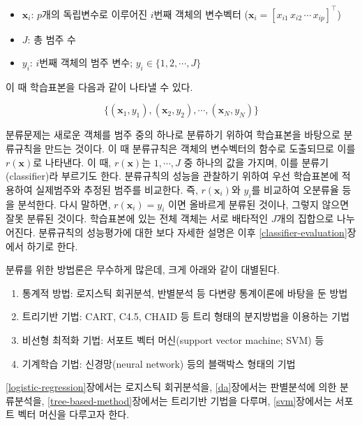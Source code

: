 \documentclass[]{book}
\providecommand{\tightlist}{%
  \setlength{\itemsep}{0pt}\setlength{\parskip}{0pt}}
\begin{document}
\begin{itemize}
\tightlist
\item
  \(\mathbf{x}_i\): \(p\)개의 독립변수로 이루어진 \(i\)번째 객체의 변수벡터 (\(\mathbf{x}_i = [x_{i1} \, x_{i2} \, \cdots \, x_{ip}]^\top\))
\item
  \(J\): 총 범주 수
\item
  \(y_i\): \(i\)번째 객체의 범주 변수; \(y_i \in \{1, 2, \cdots, J\}\)
\end{itemize}

이 때 학습표본을 다음과 같이 나타낼 수 있다.

\begin{equation*}
\{(\mathbf{x}_1, y_1), (\mathbf{x}_2, y_2), \cdots, (\mathbf{x}_N, y_N)\}
\end{equation*}

분류문제는 새로운 객체를 범주 중의 하나로 분류하기 위하여 학습표본을 바탕으로 분류규칙을 만드는 것이다. 이 때 분류규칙은 객체의 변수벡터의 함수로 도출되므로 이를 \(r(\mathbf{x})\)로 나타낸다. 이 때, \(r(\mathbf{x})\)는 \(1, \cdots, J\) 중 하나의 값을 가지며, 이를 분류기(classifier)라 부르기도 한다. 분류규칙의 성능을 관찰하기 위하여 우선 학습표본에 적용하여 실제범주와 추정된 범주를 비교한다. 즉, \(r(\mathbf{x}_i)\)와 \(y_i\)를 비교하여 오분류율 등을 분석한다. 다시 말하면, \(r(\mathbf{x}_i) = y_i\) 이면 올바르게 분류된 것이나, 그렇지 않으면 잘못 분류된 것이다. 학습표본에 있는 전체 객체는 서로 배타적인 \(J\)개의 집합으로 나누어진다. 분류규칙의 성능평가에 대한 보다 자세한 설명은 이후 \ref{classifier-evaluation}장에서 하기로 한다.

분류를 위한 방법론은 무수하게 많은데, 크게 아래와 같이 대별된다.

\begin{enumerate}
\def\labelenumi{\arabic{enumi}.}
\tightlist
\item
  통계적 방법: 로지스틱 회귀분석, 반별분석 등 다변량 통계이론에 바탕을 둔 방법
\item
  트리기반 기법: CART, C4.5, CHAID 등 트리 형태의 분지방법을 이용하는 기법
\item
  비선형 최적화 기법: 서포트 벡터 머신(support vector machine; SVM) 등
\item
  기계학습 기법: 신경망(neural network) 등의 블랙박스 형태의 기법
\end{enumerate}

\ref{logistic-regression}장에서는 로지스틱 회귀분석을, \ref{da}장에서는 판별분석에 의한 분류분석을, \ref{tree-based-method}장에서는 트리기반 기법을 다루며, \ref{svm}장에서는 서포트 벡터 머신을 다루고자 한다.
\end{document}

